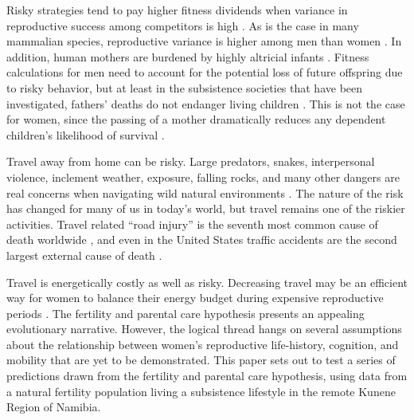 Risky strategies tend to pay higher fitness dividends when variance in reproductive success among competitors is high \citep{clutton1991sexual, clutton2007sexual, wilson1985competitiveness}.  As is the case in many mammalian species, reproductive variance is higher among men than women \citep{betzig2012means}.  In addition, human mothers are burdened by highly altricial infants \citep{campbell1999staying}.  Fitness calculations for men need to account for the potential loss of future offspring due to risky behavior, but at least in the subsistence societies that have been investigated, fathers' deaths do not endanger living children \citep{sear2008keeps}.  This is not the case for women, since the passing of a mother dramatically reduces any dependent children's likelihood of survival \citep{hill1996ache, sear2008keeps}.  


Travel away from home can be risky.  Large predators, snakes, interpersonal violence, inclement weather, exposure, falling rocks, and many other dangers are real concerns when navigating wild natural environments \citep{treves1999risk, pugh1980incidence, walker2001bioarchaeological}.  The nature of the risk has changed for many of us in today's world, but travel remains one of the riskier activities.  Travel related ``road injury'' is the seventh most common cause of death worldwide \citep{krug2000global}, and even in the United States traffic accidents are the second largest external cause of death \citep{sherry2010cdc}.  

Travel is energetically costly as well as risky.  Decreasing travel may be an efficient way for women to balance their energy budget during expensive reproductive periods \citep{dufour2002comparative, ellison2003energetics}.  The fertility and parental care hypothesis presents an appealing evolutionary narrative. However, the logical thread hangs on several assumptions about the relationship between women’s reproductive life-history, cognition, and mobility that are yet to be demonstrated.  This paper sets out to test a series of predictions drawn from the fertility and parental care hypothesis, using data from a natural fertility population living a subsistence lifestyle in the remote Kunene Region of Namibia.

